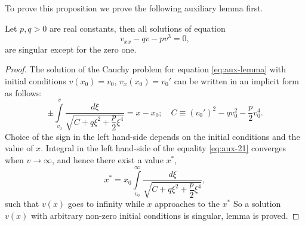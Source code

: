 To prove this proposition we prove the following auxiliary lemma first.
\begin{lemma}
	Let $p, q > 0$ are real constants, then all solutions of equation
	\begin{equation}
		v_{xx} - q v - p v^3 = 0,
		\label{eq:aux-lemma}
	\end{equation}
	are singular except for the zero one.
\end{lemma}
\begin{proof}
	The solution of the Cauchy problem for equation \eqref{eq:aux-lemma} with initial conditions $v(x_0) = v_0$, $v_x(x_0) = v_0'$ can be written in an implicit form as follows:
	\begin{equation}
		\pm \int \limits_{v_0}^{v} \dfrac{d\xi}{\sqrt{C + q \xi^2 + \dfrac{p}{2} \xi^4}} = x - x_0;	\quad C \equiv (v_0')^2 - q v_0^2 - \dfrac{p}{2} v_0^4.
		\label{eq:aux-21}
	\end{equation}
	Choice of the sign in the left hand-side depends on the initial conditions and the value of $x$.
	Integral in the left hand-side of the equality \eqref{eq:aux-21} converges when $v \to \infty$, and hence there exist a value $x^*$,
	\begin{equation}
		x^* = x_0 \int \limits_{v_0}^{\infty} \dfrac{d\xi}{\sqrt{C + q \xi^2 + \dfrac{p}{2} \xi^4}},
	\end{equation}
	such that $v(x)$ goes to infinity while $x$ approaches to the $x^*$ 
	So a solution $v(x)$ with arbitrary non-zero initial conditions is singular, lemma is proved.
\end{proof}

